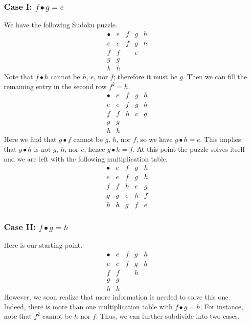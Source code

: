 \begin{solution}
	\subsubsection*{Case I: $f\bullet g = e$}
	We have the following Sudoku puzzle.
	{%
		\renewcommand{\arraystretch}{1.5}
		\[
		\begin{array}{c||c|c|c|c}
			\bullet & e & f & g & h\\
			\hline
			\hline
			e & e & f & g & h\\
			\hline
			f & f &  & e & \\
			\hline
			g & g & &  & \\
			\hline
			h & h &   &  & 
		\end{array}
		\]
	}
	Note that $f\bullet h $ cannot be $h$, $e$, nor $f$; therefore it must be $g$. Then we can fill the remaining entry in the second row $f^2 = h$.
	{%
		\renewcommand{\arraystretch}{1.5}
		\[
		\begin{array}{c||c|c|c|c}
			\bullet & e & f & g & h\\
			\hline
			\hline
			e & e & f & g & h\\
			\hline
			f & f & h & e & g\\
			\hline
			g & g &  &  & \\
			\hline
			h & h &   &  & 
		\end{array}
		\]
	}
	Here we find that $g\bullet f$ cannot be $g$, $h$, nor $f$, so we have $g\bullet h = e$. This implies that $g\bullet h$ is not $g$, $h$, nor $e$; hence $g\bullet h = f$. At this point the puzzle solves itself and we are left with the following multiplication table.
	{%
		\renewcommand{\arraystretch}{1.5}
		\[
		\begin{array}{c||c|c|c|c}
			\bullet & e & f & g & h\\
			\hline
			\hline
			e & e & f & g & h\\
			\hline
			f & f & h & e & g\\
			\hline
			g & g & e& h &f \\
			\hline
			h & h & g  & f & e
		\end{array}
		\]
	}
	\subsubsection*{Case II: $f\bullet g = h$}
	Here is our starting point.
	{%
		\renewcommand{\arraystretch}{1.5}
		\[
		\begin{array}{c||c|c|c|c}
			\bullet & e & f & g & h\\
			\hline
			\hline
			e & e & f & g & h\\
			\hline
			f & f &  & h & \\
			\hline
			g & g & &  & \\
			\hline
			h & h &   &  & 
		\end{array}
		\]
	}
	However, we soon realize that more information is needed to solve this one. Indeed, there is more than one multiplication table with $f\bullet g = h$. For instance, note that $f^2$ cannot be $h$ nor $f$. Thus, we can further subdivide into two cases.

\end{solution}
